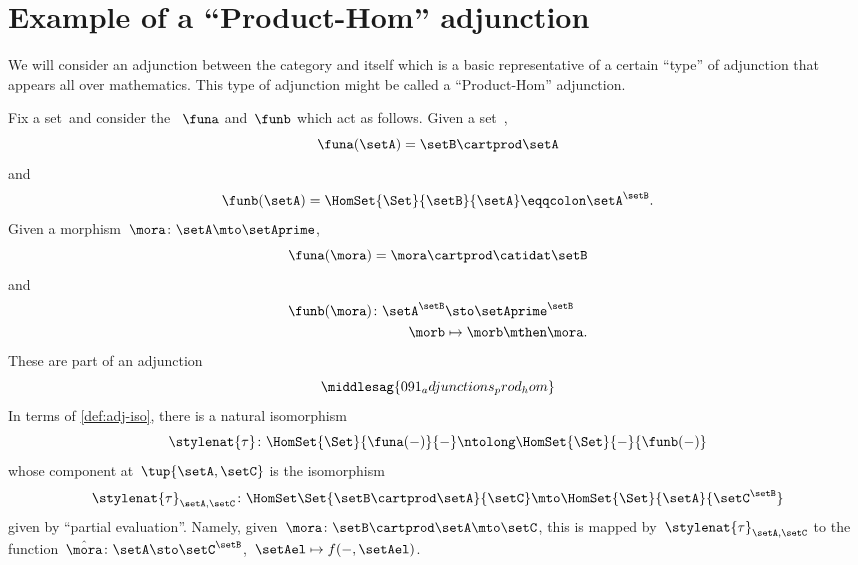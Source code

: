 
\section[Product-Hom adjunction]{Example of a ``Product-Hom'' adjunction}
We will consider an adjunction between the category \Set and itself which is a basic representative of a certain ``type'' of adjunction that appears all over mathematics.
This type of adjunction might be called a ``Product-Hom'' adjunction.

Fix a set~\setB and consider the ~$\funa$ and~$\funb$ which act as follows.
Given a set~\setA,
\begin{equation}
    \funa(\setA) = \setB \cartprod \setA
\end{equation}
and
\begin{equation}
    \funb(\setA) = \HomSet{\Set}{\setB}{\setA} \eqqcolon \setA^\setB.
\end{equation}
Given a morphism~$\mora\colon \setA \mto \setAprime$,
\begin{equation}
    \funa(\mora) = \mora \cartprod \catidat\setB
\end{equation}
and
\begin{equation}
    \begin{aligned}
        \funb(\mora)\colon \setA^\setB & \sto \setAprime^\setB \\
        \morb                          & \mapsto \morb \mthen \mora.
    \end{aligned}
\end{equation}
%
These are part of an adjunction
%
\begin{equation}
    \middlesag{091_adjunctions_prod_hom}
\end{equation}
In terms of \cref{def:adj-iso}, there is a natural isomorphism
\begin{equation}
    \stylenat{\tau}\colon \HomSet{\Set}{\funa(- )}{-}  \ntolong   \HomSet{\Set}{-}{\funb( - )}
\end{equation}
whose component at~$\tup{\setA,\setC}$ is the isomorphism
\begin{equation}
    \stylenat{\tau}_{\setA,\setC} \colon \HomSet\Set{\setB\cartprod \setA}{\setC} \mto \HomSet{\Set}{\setA}{\setC^\setB}
\end{equation}
given by ``partial evaluation''.
Namely, given~$\mora \colon \setB \cartprod \setA \mto \setC$, this is mapped by~$\stylenat{\tau}_{\setA,\setC}$ to the function~$\hat \mora \colon \setA \sto \setC^\setB$,~$\setAel \mapsto f( -, \setAel)$.

